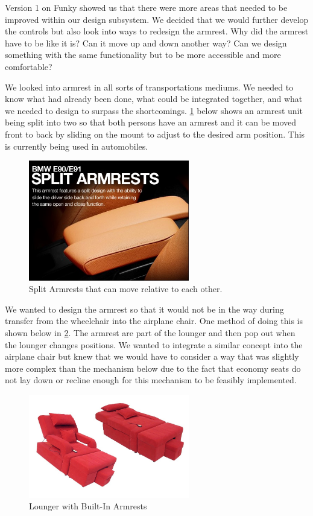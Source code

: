 Version 1 on Funky showed us that there were more areas that needed to be improved within our design subsystem.  We decided that we would further develop the controls but also look into ways to redesign the armrest.  Why did the armrest have to be like it is? Can it move up and down another way? Can we design something with the same functionality but to be more accessible and more comfortable?

We looked into armrest in all sorts of transportations mediums. We needed to know what had already been done, what could be integrated together, and what we needed to design to surpass the shortcomings.   \ref{fig:SplitArmrests.jpg} below shows an armrest unit being split into two so that both persons have an armrest and it can be moved front to back by sliding on the mount to adjust to the desired arm position. This is currently being used in automobiles.


\begin{figure}[h]
  \centering
     \includegraphics[width=7cm]{images/SplitArmrests.jpg}
   \caption{Split Armrests that can move relative to each other.\cite{splitarmrest} }
  \label{fig:SplitArmrests.jpg}
\end{figure}

We wanted to design the armrest so that it would not be in the way during transfer from the wheelchair into the airplane chair.  One method of doing this is shown below in  \ref{fig:LoungerArmrest.jpg}.  The armrest are part of the lounger and then pop out when the lounger changes positions.  We wanted to integrate a similar concept into the airplane chair but knew that we would have to consider a way that was slightly more complex than the mechanism below due to the fact that economy seats do not lay down or recline enough for this mechanism to be feasibly implemented. 


\begin{figure}[h]
  \centering
     \includegraphics[width=7cm]{images/LoungerArmrest.jpg}
   \caption{Lounger with Built-In Armrests \cite{lounger}}
  \label{fig:LoungerArmrest.jpg}
\end{figure}



